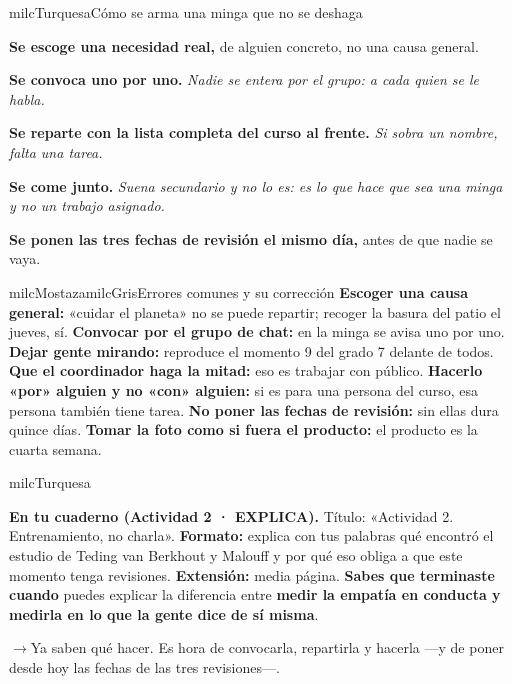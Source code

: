 \documentclass[11pt,letterpaper]{article}
\newcommand{\puente}[1]{%
  \begin{puentebox}%
    \textcolor{milcGradeDark}{$\rightarrow$}\hspace{2mm}#1%
  \end{puentebox}%
}
\begin{document}
\begin{drawbox}{milcTurquesa}{Cómo se arma una minga que no se deshaga}
\begin{pasoslista}
\item \textbf{Se escoge una necesidad real,} de alguien concreto, no una causa general.
\item \textbf{Se convoca uno por uno.} \emph{Nadie se entera por el grupo: a cada quien se le habla.}
\item \textbf{Se reparte con la lista completa del curso al frente.} \emph{Si sobra un nombre, falta una tarea.}
\item \textbf{Se come junto.} \emph{Suena secundario y no lo es: es lo que hace que sea una minga y no un trabajo asignado.}
\item \textbf{Se ponen las tres fechas de revisión el mismo día,} antes de que nadie se vaya.
\end{pasoslista}
\end{drawbox}

\begin{softbox}{milcMostaza}{milcGris}{Errores comunes y su corrección}
\textbf{Escoger una causa general:} «cuidar el planeta» no se puede repartir; recoger la basura del patio el jueves, sí. \textbf{Convocar por el grupo de chat:} en la minga se avisa uno por uno. \textbf{Dejar gente mirando:} reproduce el momento 9 del grado 7 delante de todos. \textbf{Que el coordinador haga la mitad:} eso es trabajar con público. \textbf{Hacerlo «por» alguien y no «con» alguien:} si es para una persona del curso, esa persona también tiene tarea. \textbf{No poner las fechas de revisión:} sin ellas dura quince días. \textbf{Tomar la foto como si fuera el producto:} el producto es la cuarta semana.
\end{softbox}

\begin{infoband}{milcTurquesa}


\textbf{En tu cuaderno (Actividad 2 · EXPLICA).} Título: «Actividad 2. Entrenamiento, no charla». \textbf{Formato:} explica con tus palabras qué encontró el estudio de Teding van Berkhout y Malouff y por qué eso obliga a que este momento tenga revisiones. \textbf{Extensión:} media página. \textbf{Sabes que terminaste cuando} puedes explicar la diferencia entre \textbf{medir la empatía en conducta y medirla en lo que la gente dice de sí misma}.
\end{infoband}

\puente{Ya saben qué hacer. Es hora de convocarla, repartirla y hacerla ---y de poner desde hoy las fechas de las tres revisiones---.}
\end{document}
